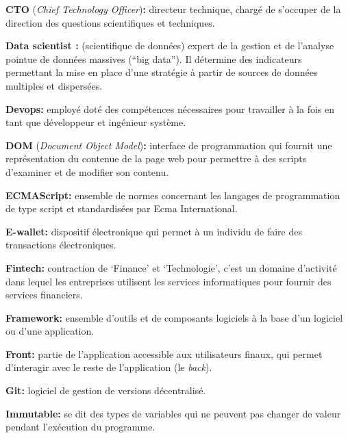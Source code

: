 \documentclass[12pt,a4paper]{article}
\begin{document}
  \bigskip

  \textbf{CTO} (\emph{Chief Technology Officer})\textbf{:} directeur
  technique, chargé de s'occuper de la direction des questions
  scientifiques et techniques.

  \bigskip

  \textbf{Data scientist :} (scientifique de données) expert de la gestion
  et de l'analyse pointue de données massives (``big data''). Il détermine
  des indicateurs permettant la mise en place d'une stratégie à partir de
  sources de données multiples et dispersées.

  \bigskip

  \textbf{Devops:} employé doté des compétences nécessaires pour
  travailler à la fois en tant que développeur et ingénieur système.

  \bigskip

  \textbf{DOM} (\emph{Document Object Model})\textbf{:} interface de
  programmation qui fournit une représentation du contenue de la page web
  pour permettre à des scripts d'examiner et de modifier son contenu.

  \bigskip

  \textbf{ECMAScript:} ensemble de normes concernant les langages de
  programmation de type script et standardisées par Ecma International.

  \bigskip

  \textbf{E-wallet:} dispositif électronique qui permet à un individu de
  faire des transactions électroniques.

  \bigskip

  \textbf{Fintech:} contraction de `Finance' et `Technologie', c'est un
  domaine d'activité dans lequel les entreprises utilisent les services
  informatiques pour fournir des services financiers.

  \bigskip

  \textbf{Framework:} ensemble d'outils et de composants logiciels à la
  base d'un logiciel ou d'une application.

  \bigskip

  \textbf{Front:} partie de l'application accessible aux utilisateurs
  finaux, qui permet d'interagir avec le reste de l'application (le
  \emph{back}).

  \bigskip

  \textbf{Git:} logiciel de gestion de versions décentralisé.

  \bigskip

  \textbf{Immutable:} se dit des types de variables qui ne peuvent pas
  changer de valeur pendant l'exécution du programme.
\end{document}
